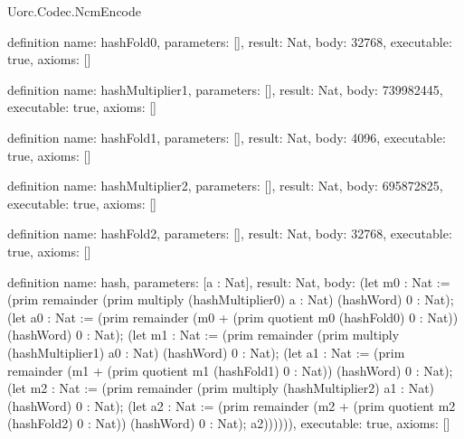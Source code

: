 \begin{lexlean}{Uorc.Codec.NcmEncode}
\begin{semanticmodule}
definition{
  name: hashFold0,
  parameters: [],
  result: Nat,
  body: 32768,
  executable: true,
  axioms: []
}

definition{
  name: hashMultiplier1,
  parameters: [],
  result: Nat,
  body: 739982445,
  executable: true,
  axioms: []
}

definition{
  name: hashFold1,
  parameters: [],
  result: Nat,
  body: 4096,
  executable: true,
  axioms: []
}

definition{
  name: hashMultiplier2,
  parameters: [],
  result: Nat,
  body: 695872825,
  executable: true,
  axioms: []
}

definition{
  name: hashFold2,
  parameters: [],
  result: Nat,
  body: 32768,
  executable: true,
  axioms: []
}

definition{
  name: hash,
  parameters: [a : Nat],
  result: Nat,
  body: (let m0 : Nat := (prim remainder (prim multiply (hashMultiplier0) a : Nat) (hashWord) 0 : Nat); (let a0 : Nat := (prim remainder (m0 + (prim quotient m0 (hashFold0) 0 : Nat)) (hashWord) 0 : Nat); (let m1 : Nat := (prim remainder (prim multiply (hashMultiplier1) a0 : Nat) (hashWord) 0 : Nat); (let a1 : Nat := (prim remainder (m1 + (prim quotient m1 (hashFold1) 0 : Nat)) (hashWord) 0 : Nat); (let m2 : Nat := (prim remainder (prim multiply (hashMultiplier2) a1 : Nat) (hashWord) 0 : Nat); (let a2 : Nat := (prim remainder (m2 + (prim quotient m2 (hashFold2) 0 : Nat)) (hashWord) 0 : Nat); a2)))))),
  executable: true,
  axioms: []
}


\end{semanticmodule}
\end{lexlean}
